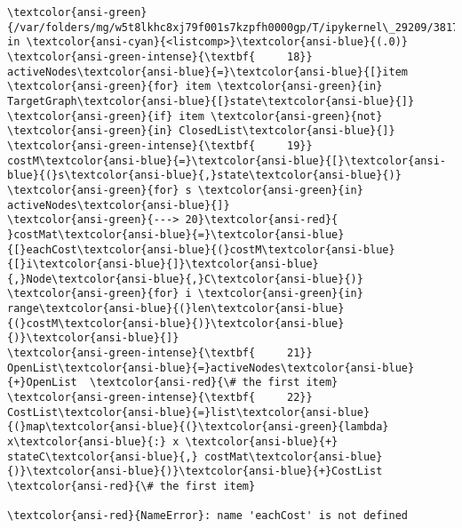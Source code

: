 \documentclass[11pt]{article}
\begin{document}
\begin{Verbatim}[commandchars=\\\{\}, frame=single, framerule=2mm, rulecolor=\color{outerrorbackground}]
\textcolor{ansi-green}{/var/folders/mg/w5t8lkhc8xj79f001s7kzpfh0000gp/T/ipykernel\_29209/3817949483.py} in \textcolor{ansi-cyan}{<listcomp>}\textcolor{ansi-blue}{(.0)}
\textcolor{ansi-green-intense}{\textbf{     18}}     activeNodes\textcolor{ansi-blue}{=}\textcolor{ansi-blue}{[}item \textcolor{ansi-green}{for} item \textcolor{ansi-green}{in} TargetGraph\textcolor{ansi-blue}{[}state\textcolor{ansi-blue}{]} \textcolor{ansi-green}{if} item \textcolor{ansi-green}{not} \textcolor{ansi-green}{in} ClosedList\textcolor{ansi-blue}{]}
\textcolor{ansi-green-intense}{\textbf{     19}}     costM\textcolor{ansi-blue}{=}\textcolor{ansi-blue}{[}\textcolor{ansi-blue}{(}s\textcolor{ansi-blue}{,}state\textcolor{ansi-blue}{)} \textcolor{ansi-green}{for} s \textcolor{ansi-green}{in} activeNodes\textcolor{ansi-blue}{]}
\textcolor{ansi-green}{---> 20}\textcolor{ansi-red}{     }costMat\textcolor{ansi-blue}{=}\textcolor{ansi-blue}{[}eachCost\textcolor{ansi-blue}{(}costM\textcolor{ansi-blue}{[}i\textcolor{ansi-blue}{]}\textcolor{ansi-blue}{,}Node\textcolor{ansi-blue}{,}C\textcolor{ansi-blue}{)} \textcolor{ansi-green}{for} i \textcolor{ansi-green}{in} range\textcolor{ansi-blue}{(}len\textcolor{ansi-blue}{(}costM\textcolor{ansi-blue}{)}\textcolor{ansi-blue}{)}\textcolor{ansi-blue}{]}
\textcolor{ansi-green-intense}{\textbf{     21}}     OpenList\textcolor{ansi-blue}{=}activeNodes\textcolor{ansi-blue}{+}OpenList  \textcolor{ansi-red}{\# the first item}
\textcolor{ansi-green-intense}{\textbf{     22}}     CostList\textcolor{ansi-blue}{=}list\textcolor{ansi-blue}{(}map\textcolor{ansi-blue}{(}\textcolor{ansi-green}{lambda} x\textcolor{ansi-blue}{:} x \textcolor{ansi-blue}{+} stateC\textcolor{ansi-blue}{,} costMat\textcolor{ansi-blue}{)}\textcolor{ansi-blue}{)}\textcolor{ansi-blue}{+}CostList  \textcolor{ansi-red}{\# the first item}

\textcolor{ansi-red}{NameError}: name 'eachCost' is not defined
    \end{Verbatim}
\end{document}
